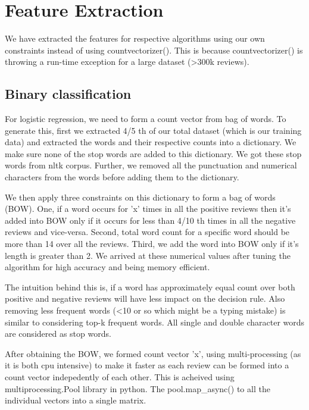 \documentclass{article}
\begin{document}

\section{Feature Extraction}

We have extracted the features for respective algorithms using our own constraints instead of using countvectorizer(). This is because countvectorizer() is throwing a run-time exception for a large dataset (\textgreater300k reviews).

\subsection{Binary classification}
For logistic regression, we need to form a count vector from bag of words. To generate this, first we extracted 4/5 th of our total dataset (which is our training data) and extracted the words and their respective counts into a dictionary. We make sure none of the stop words are added to this dictionary. We got these stop words from nltk corpus. Further, we removed all the punctuation and numerical characters from the words before adding them to the dictionary. 


We then apply three constraints on this dictionary to form a bag of words (BOW). One, if a word occurs for 'x' times in all the positive reviews then it's added into BOW only if it occurs for less than 4/10 th times in all the negative reviews and vice-versa. Second, total word count for a specific word should be more than 14 over all the reviews. Third, we add the word into BOW only if it's length is greater than 2. We arrived at these numerical values after tuning the algorithm for high accuracy and being memory efficient. 


The intuition behind this is, if a word has approximately equal count over both positive and negative reviews will have less impact on the decision rule. Also removing less frequent words (\textless10 or so which might be a typing mistake) is similar to considering top-k frequent words. All single and double character words are considered as stop words.

After obtaining the BOW, we formed count vector 'x', using multi-processing (as it is both cpu intensive) to make it faster as each review can be formed into a count vector indepedently of each other. This is acheived using multiprocessing.Pool library in python. The pool.map\_async() to  all the individual vectors into a single matrix. 
\end{document}
